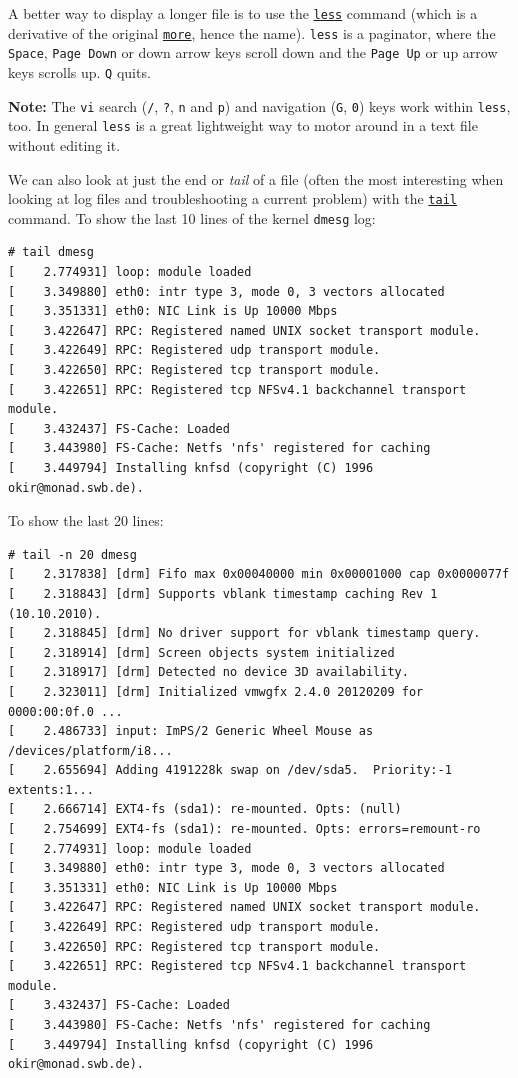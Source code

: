 \documentclass[10pt,]{book}
\numberwithin{figure}{chapter}
\begin{document}
A better way to display a longer file is to use the
\href{http://linux.die.net/man/1/less}{\texttt{less}} command (which is
a derivative of the original
\href{http://linux.die.net/man/1/more}{\texttt{more}}, hence the name).
\texttt{less} is a paginator, where the \texttt{Space},
\texttt{Page Down} or down arrow keys scroll down and the
\texttt{Page Up} or up arrow keys scrolls up. \texttt{Q} quits.

\textbf{Note:} The \texttt{vi} search (\texttt{/}, \texttt{?},
\texttt{n} and \texttt{p}) and navigation (\texttt{G}, \texttt{0}) keys
work within \texttt{less}, too. In general \texttt{less} is a great
lightweight way to motor around in a text file without editing it.

We can also look at just the end or \emph{tail} of a file (often the
most interesting when looking at log files and troubleshooting a current
problem) with the \href{http://linux.die.net/man/1/tail}{\texttt{tail}}
command. To show the last 10 lines of the kernel \texttt{dmesg} log:

\begin{verbatim}
# tail dmesg
[    2.774931] loop: module loaded
[    3.349880] eth0: intr type 3, mode 0, 3 vectors allocated
[    3.351331] eth0: NIC Link is Up 10000 Mbps
[    3.422647] RPC: Registered named UNIX socket transport module.
[    3.422649] RPC: Registered udp transport module.
[    3.422650] RPC: Registered tcp transport module.
[    3.422651] RPC: Registered tcp NFSv4.1 backchannel transport module.
[    3.432437] FS-Cache: Loaded
[    3.443980] FS-Cache: Netfs 'nfs' registered for caching
[    3.449794] Installing knfsd (copyright (C) 1996 okir@monad.swb.de).
\end{verbatim}

To show the last 20 lines:

\begin{verbatim}
# tail -n 20 dmesg
[    2.317838] [drm] Fifo max 0x00040000 min 0x00001000 cap 0x0000077f
[    2.318843] [drm] Supports vblank timestamp caching Rev 1 (10.10.2010).
[    2.318845] [drm] No driver support for vblank timestamp query.
[    2.318914] [drm] Screen objects system initialized
[    2.318917] [drm] Detected no device 3D availability.
[    2.323011] [drm] Initialized vmwgfx 2.4.0 20120209 for 0000:00:0f.0 ...
[    2.486733] input: ImPS/2 Generic Wheel Mouse as /devices/platform/i8...
[    2.655694] Adding 4191228k swap on /dev/sda5.  Priority:-1 extents:1...
[    2.666714] EXT4-fs (sda1): re-mounted. Opts: (null)
[    2.754699] EXT4-fs (sda1): re-mounted. Opts: errors=remount-ro
[    2.774931] loop: module loaded
[    3.349880] eth0: intr type 3, mode 0, 3 vectors allocated
[    3.351331] eth0: NIC Link is Up 10000 Mbps
[    3.422647] RPC: Registered named UNIX socket transport module.
[    3.422649] RPC: Registered udp transport module.
[    3.422650] RPC: Registered tcp transport module.
[    3.422651] RPC: Registered tcp NFSv4.1 backchannel transport module.
[    3.432437] FS-Cache: Loaded
[    3.443980] FS-Cache: Netfs 'nfs' registered for caching
[    3.449794] Installing knfsd (copyright (C) 1996 okir@monad.swb.de).
\end{verbatim}
\end{document}

